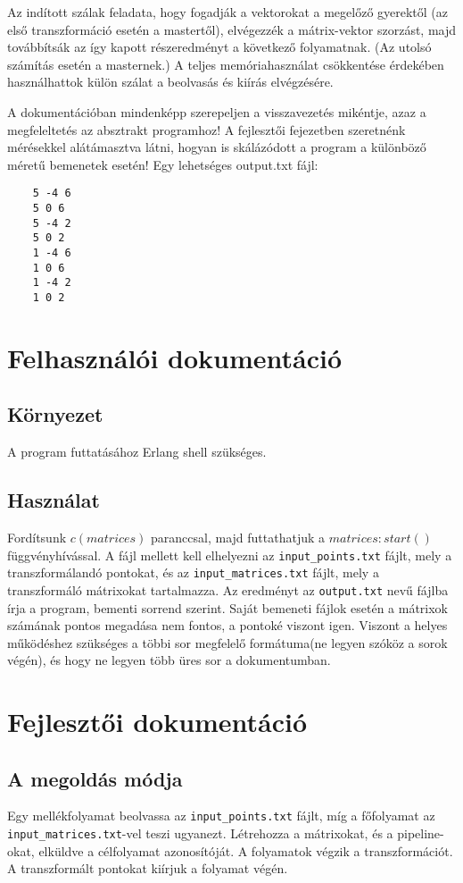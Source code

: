 \documentclass{article}
\begin{document}
	Az indított szálak feladata, hogy fogadják a vektorokat a megelőző gyerektől (az első transzformáció esetén a mastertől), elvégezzék a mátrix-vektor szorzást, majd továbbítsák az így kapott részeredményt a következő folyamatnak. (Az utolsó számítás esetén a masternek.) A teljes memóriahasználat csökkentése érdekében használhattok külön szálat a beolvasás és kiírás elvégzésére.
	
	A dokumentációban mindenképp szerepeljen a visszavezetés mikéntje, azaz a megfeleltetés az absztrakt programhoz! A fejlesztői fejezetben szeretnénk mérésekkel alátámasztva látni, hogyan is skálázódott a program a különböző méretű bemenetek esetén! Egy lehetséges output.txt fájl:
	
	\begin{verbatim}
	5 -4 6
	5 0 6
	5 -4 2
	5 0 2
	1 -4 6
	1 0 6
	1 -4 2
	1 0 2
	\end{verbatim}

	
	\section{Felhasználói dokumentáció}
	
	\subsection{Környezet}
	A program futtatásához Erlang shell szükséges. 
	
	\subsection{Használat}
	Fordítsunk \(c(matrices)\) paranccsal, majd futtathatjuk a \(matrices:start()\) függvényhívással. A fájl mellett kell elhelyezni az \texttt{input\_points.txt} fájlt, mely a transzformálandó pontokat, és az \texttt{input\_matrices.txt} fájlt, mely a transzformáló mátrixokat tartalmazza. Az eredményt az \texttt{output.txt} nevű fájlba írja a program, bementi sorrend szerint. Saját bemeneti fájlok esetén a mátrixok számának pontos megadása nem fontos, a pontoké viszont igen. Viszont  a helyes működéshez szükséges a többi sor megfelelő formátuma(ne legyen szóköz a sorok végén), és hogy ne legyen több üres sor a dokumentumban.
	
	\section{Fejlesztői dokumentáció}
	
	\subsection{A megoldás módja}
	Egy mellékfolyamat beolvassa az \texttt{input\_points.txt} fájlt, míg a főfolyamat az \texttt{input\_matrices.txt}-vel teszi ugyanezt. Létrehozza a mátrixokat, és a pipeline-okat, elküldve a célfolyamat azonosítóját. A folyamatok végzik a transzformációt. A transzformált pontokat kiírjuk a folyamat végén. 
	
\end{document}
